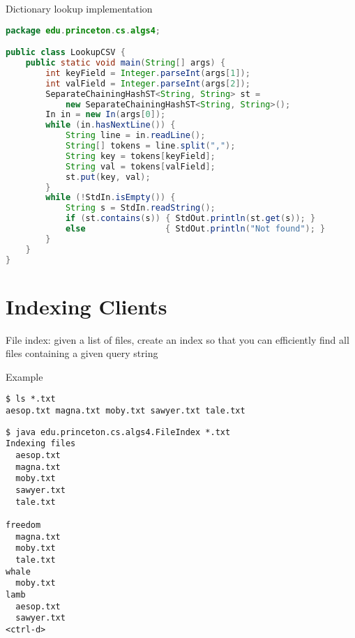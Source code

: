 \documentclass[8pt,a4paper,compress]{beamer}
\begin{document}
\begin{frame}[fragile]
Dictionary lookup implementation
\begin{lstlisting}[language=Java]
package edu.princeton.cs.algs4;

public class LookupCSV {
    public static void main(String[] args) {
        int keyField = Integer.parseInt(args[1]);
        int valField = Integer.parseInt(args[2]);
        SeparateChainingHashST<String, String> st = 
            new SeparateChainingHashST<String, String>();
        In in = new In(args[0]);
        while (in.hasNextLine()) {
            String line = in.readLine();
            String[] tokens = line.split(",");
            String key = tokens[keyField];
            String val = tokens[valField];
            st.put(key, val);
        }
        while (!StdIn.isEmpty()) {
            String s = StdIn.readString();
            if (st.contains(s)) { StdOut.println(st.get(s)); }
            else                { StdOut.println("Not found"); }
        }
    }
}
\end{lstlisting}
\end{frame}

\section{Indexing Clients}
\begin{frame}[fragile]
\pause

File index: given a list of files, create an index so that you can efficiently find all files containing a given query string

\pause
\bigskip

Example
\begin{lstlisting}[language={}]
$ ls *.txt
aesop.txt magna.txt moby.txt sawyer.txt tale.txt 
\end{lstlisting}

\begin{lstlisting}[language={}]
$ java edu.princeton.cs.algs4.FileIndex *.txt
Indexing files
  aesop.txt 
  magna.txt 
  moby.txt 
  sawyer.txt 
  tale.txt 

freedom
  magna.txt 
  moby.txt 
  tale.txt
whale
  moby.txt
lamb
  aesop.txt
  sawyer.txt 
<ctrl-d>
\end{lstlisting}
\end{frame}
\end{document}
